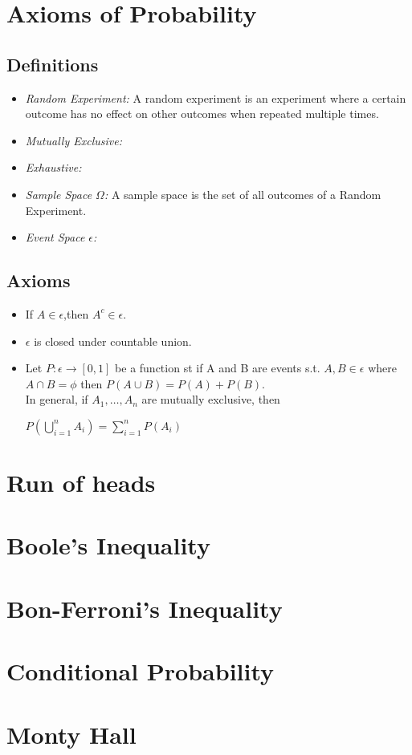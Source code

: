 \documentclass[a4paper]{article}
\begin{document}
\section{Axioms of Probability}
\subsection{Definitions}
\begin{itemize}
    \item \emph{Random Experiment: } A random experiment is an experiment where a certain outcome
        has no effect on other outcomes when repeated multiple times.
    \item \emph{Mutually Exclusive: }
    \item \emph{Exhaustive: }
    \item \emph{Sample Space \(\Omega\): } A sample space is the set of all outcomes of a Random Experiment.
    \item \emph{Event Space \(\epsilon\): }
\end{itemize}
\subsection{Axioms}


\begin{itemize}
    \item If \(A\in\epsilon\),then \(A^c\in\epsilon\).
    \item \(\epsilon\) is closed under countable union.
    \item Let $P:\epsilon\rightarrow[0,1]$ be a function st if A and B are events s.t. 
       \(A,B\in \epsilon \) where \(A\cap B = \phi\) then 
       \(P(A\cup B) = P(A)+P(B)\).\\ 
       In general, if \(A_1, \dots, A_n\) are mutually exclusive, then \\ 
       \begin{center}
           \(P(\bigcup\limits_{i=1}^{n}A_i) = \sum\limits_{i=1}^{n}P(A_i)\)
       \end{center}
\end{itemize}
\section{Run of heads}
\section{Boole's Inequality}
\section{Bon-Ferroni's Inequality}
\section{Conditional Probability}

\section{Monty Hall}
\end{document}
